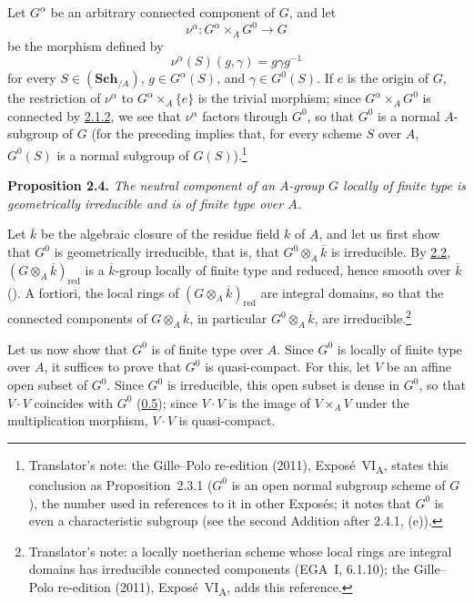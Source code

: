 Let \(G^\alpha\) be an arbitrary connected component of \(G\), and let
\[
  \nu^\alpha:G^\alpha\times_AG^0\longrightarrow G
\]
be the morphism defined by
\[
  \nu^\alpha(S)(g,\gamma)=g\gamma g^{-1}
\]
for every \(S\in(\mathbf{Sch}_{/A})\), \(g\in G^\alpha(S)\), and
\(\gamma\in G^0(S)\). If \(e\) is the origin of \(G\), the restriction of
\(\nu^\alpha\) to \(G^\alpha\times_A\{e\}\) is the trivial morphism;
since \(G^\alpha\times_AG^0\) is connected by \hyperref[lem:sga3-VIA-2.1.2]{2.1.2}, we see that
\(\nu^\alpha\) factors through \(G^0\),
\label{prop:sga3-VIA-2.3.1}%
so that \(G^0\) is a normal \(A\)-subgroup of \(G\) (for the preceding
implies that, for every scheme \(S\) over \(A\), \(G^0(S)\) is a normal
subgroup of \(G(S)\)).\footnote{Translator's note: the Gille--Polo re-edition (2011),
Exposé~VI\textsubscript{A}, states this conclusion as Proposition~2.3.1 (\(G^0\) is an open normal
subgroup scheme of \(G\)), the number used in references to it in other Exposés; it notes that \(G^0\)
is even a characteristic subgroup (see the second Addition after 2.4.1, (e)).}

\medskip
{}\label{prop:sga3-VIA-2.4}%
\noindent\textbf{Proposition 2.4.}
\textit{The neutral component of an \(A\)-group \(G\) locally of finite
type is geometrically irreducible and is of finite type over \(A\).}

\medskip
Let \(\overline k\) be the algebraic closure of the residue field \(k\)
of \(A\), and let us first show that \(G^0\) is geometrically
irreducible, that is, that \(G^0\otimes_A\overline k\) is irreducible.
By \hyperref[par:sga3-VIA-2.2]{2.2}, \((G\otimes_A\overline k)_{\mathrm{red}}\) is a
\(\overline k\)-group locally of finite type and reduced, hence smooth
over \(\overline k\) (). A fortiori, the local rings of
\((G\otimes_A\overline k)_{\mathrm{red}}\) are integral domains, so that
the connected components of \(G\otimes_A\overline k\), in particular
\(G^0\otimes_A\overline k\), are irreducible.\footnote{Translator's note: a locally noetherian scheme whose local rings
are integral domains has irreducible connected components (EGA~I, 6.1.10); the Gille--Polo
re-edition (2011), Exposé~VI\textsubscript{A}, adds this reference.}

Let us now show that \(G^0\) is of finite type over \(A\). Since \(G^0\)
is locally of finite type over \(A\), it suffices to prove that \(G^0\) is
quasi-compact. For this, let \(V\) be an affine open subset of \(G^0\).
Since \(G^0\) is irreducible, this open subset is dense in \(G^0\), so
that \(V\cdot V\) coincides with \(G^0\) (\hyperref[sga3:VIA:0.5]{0.5}); since \(V\cdot V\) is the
image of \(V\times_AV\) under the multiplication morphism, \(V\cdot V\)
is quasi-compact.

